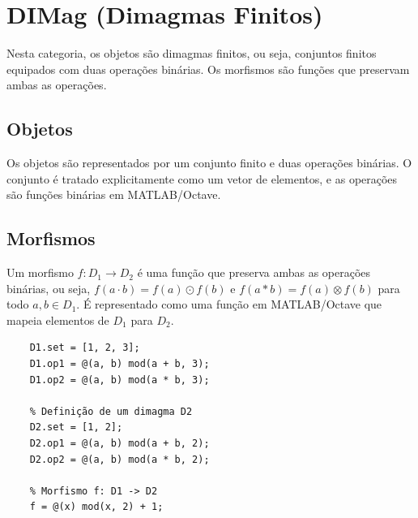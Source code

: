 \section{DIMag (Dimagmas Finitos)}
\label{sec:dimag}

Nesta categoria, os objetos são dimagmas finitos, ou seja, conjuntos finitos equipados com duas operações binárias. Os morfismos são funções que preservam ambas as operações.

\subsection{Objetos}
Os objetos são representados por um conjunto finito e duas operações binárias. O conjunto é tratado explicitamente como um vetor de elementos, e as operações são funções binárias em MATLAB/Octave.

\subsection{Morfismos}
Um morfismo $f: D_1 \to D_2$ é uma função que preserva ambas as operações binárias, ou seja, $f(a \cdot b) = f(a) \odot f(b)$ e $f(a \ast b) = f(a) \otimes f(b)$ para todo $a, b \in D_1$. É representado como uma função em MATLAB/Octave que mapeia elementos de $D_1$ para $D_2$.

\begin{lstlisting}[style=matlab, caption={Exemplo de Dimagma e Morfismo}]
	% Definição de um dimagma D1
	D1.set = [1, 2, 3];
	D1.op1 = @(a, b) mod(a + b, 3);
	D1.op2 = @(a, b) mod(a * b, 3);
	
	% Definição de um dimagma D2
	D2.set = [1, 2];
	D2.op1 = @(a, b) mod(a + b, 2);
	D2.op2 = @(a, b) mod(a * b, 2);
	
	% Morfismo f: D1 -> D2
	f = @(x) mod(x, 2) + 1;
\end{lstlisting}